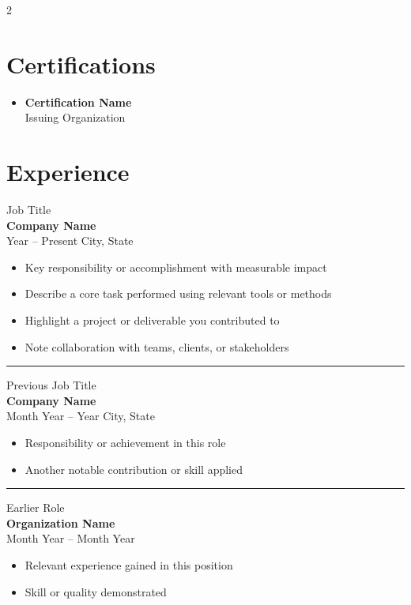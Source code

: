 \documentclass[10pt, letterpaper]{article}
\newcommand{\resumeEntry}[4]{%
    {\large #1} \\
    \textbf{#2} \\
    {\small \faCalendar\enspace #3 \quad \faMapMarker*\enspace #4}
}
\newcommand{\resumeEntryNoLocation}[3]{%
    {\large #1} \\
    \textbf{#2} \\
    {\small \faCalendar\enspace #3}
}
\begin{document}
\begin{multicols}{2}

\section{Certifications}

\begin{itemize}
    \item \textbf{Certification Name} \\
    {\small Issuing Organization}
\end{itemize}

\columnbreak


\section{Experience}

\resumeEntry{Job Title}{Company Name}{Year -- Present}{City, State}
\begin{itemize}
    \item Key responsibility or accomplishment with measurable impact
    \item Describe a core task performed using relevant tools or methods
    \item Highlight a project or deliverable you contributed to
    \item Note collaboration with teams, clients, or stakeholders
\end{itemize}

\vspace{6pt}\hrule\vspace{6pt}

\resumeEntry{Previous Job Title}{Company Name}{Month Year -- Year}{City, State}
\begin{itemize}
    \item Responsibility or achievement in this role
    \item Another notable contribution or skill applied
\end{itemize}

\vspace{6pt}\hrule\vspace{6pt}

\resumeEntryNoLocation{Earlier Role}{Organization Name}{Month Year -- Month Year}
\begin{itemize}
    \item Relevant experience gained in this position
    \item Skill or quality demonstrated
\end{itemize}


\end{multicols}
\end{document}
